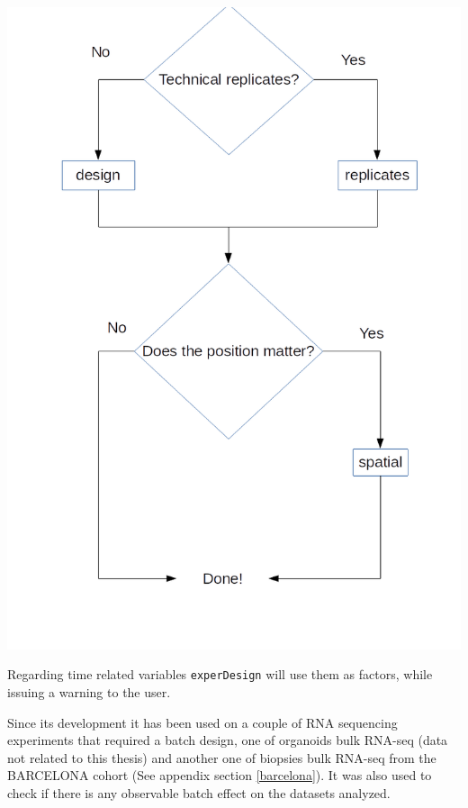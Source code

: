 \documentclass[
  12pt,
  a4paper,
  twoside,
  openright]{book}
\let\origfigure\figure
\let\endorigfigure\endfigure
\renewenvironment{figure}[1][2] {
    \expandafter\origfigure\expandafter[!htp]
} {
    \endorigfigure
}
\begin{document}
\begin{figure}
\includegraphics[width=1\linewidth]{images/experDesign-flowchart} \caption[experDesign functions and workflow]{`experDesign` functions and workflow. Workflow for users of the package showing which functions can be used depending on the experiment design they have.}\label{fig:experdesign-flowchart}
\end{figure}

Regarding time related variables \texttt{experDesign} will use them as factors, while issuing a warning to the user.

Since its development it has been used on a couple of RNA sequencing experiments that required a batch design, one of organoids bulk RNA-seq (data not related to this thesis) and another one of biopsies bulk RNA-seq from the BARCELONA cohort (See appendix section \ref{barcelona}).
It was also used to check if there is any observable batch effect on the datasets analyzed.
\end{document}
